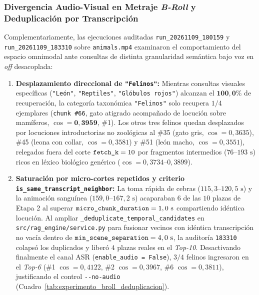 \subsubsection{Divergencia Audio-Visual en Metraje \textit{B-Roll} y Deduplicación por Transcripción}
\label{subsubsec:divergencia_broll_y_deduplicacion}
Complementariamente, las ejecuciones auditadas \texttt{run\_20261109\_180159} y \texttt{run\_20261109\_183310} sobre \texttt{animals.mp4} examinaron el comportamiento del espacio omnimodal ante consultas de distinta granularidad semántica bajo voz en \textit{off} desacoplada:
\begin{enumerate}
    \item \textbf{Desplazamiento direccional de \texttt{\string"Felinos\string"}:} Mientras consultas visuales específicas (\texttt{\string"León\string"}, \texttt{\string"Reptiles\string"}, \texttt{\string"Glóbulos rojos\string"}) alcanzan el $\mathbf{100,0\%}$ de recuperación, la categoría taxonómica \texttt{\string"Felinos\string"} solo recupera $1/4$ ejemplares (\texttt{chunk \#66}, gato atigrado acompañado de locución sobre mamíferos, $\cos = \mathbf{0,3959}$, \#1). Los otros tres felinos quedan desplazados por locuciones introductorias no zoológicas al \#35 (gato gris, $\cos = 0,3635$), \#45 (leona con collar, $\cos = 0,3581$) y \#51 (león macho, $\cos = 0,3551$), relegados fuera del corte $\text{\texttt{fetch\_k}} = 10$ por fragmentos intermedios ($76\text{--}193\text{ s}$) ricos en léxico biológico genérico ($\cos = 0,3734\text{--}0,3899$).
    \item \textbf{Saturación por micro-cortes repetidos y criterio \texttt{is\_same\_transcript\_neighbor}:} La toma rápida de cebras ($115,3\text{--}120,5\text{ s}$) y la animación sanguínea ($159,0\text{--}167,2\text{ s}$) acaparaban $6$ de las $10$ plazas de Etapa 2 al superar $\text{\texttt{micro\_\allowbreak chunk\_\allowbreak duration}} = 1,0\text{ s}$ compartiendo idéntica locución. Al ampliar \texttt{\_deduplicate\_\allowbreak temporal\_\allowbreak candidates} en \texttt{src/\allowbreak rag\_engine/\allowbreak service.py} para fusionar vecinos con idéntica transcripción no vacía dentro de $\text{\texttt{min\_\allowbreak scene\_\allowbreak separation}} = 4,0\text{ s}$, la auditoría \texttt{183310} colapsó los duplicados y liberó $4$ plazas reales en el \textit{Top-10}. Desactivando finalmente el canal ASR (\texttt{enable\_audio = False}), $3/4$ felinos ingresaron en el \textit{Top-6} (\#1 $\cos=0,4122$, \#2 $\cos=0,3967$, \#6 $\cos=0,3811$), justificando el control \texttt{-{}-no-audio} (Cuadro~\ref{tab:experimento_broll_deduplicacion}).
\end{enumerate}

